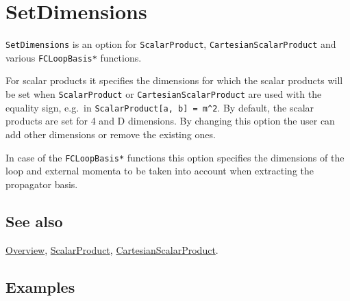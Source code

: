 \documentclass[../FeynCalcManual.tex]{subfiles}
\begin{document}
\hypertarget{setdimensions}{
\section{SetDimensions}\label{setdimensions}}

\texttt{SetDimensions} is an option for \texttt{ScalarProduct},
\texttt{CartesianScalarProduct} and various \texttt{FCLoopBasis*}
functions.

For scalar products it specifies the dimensions for which the scalar
products will be set when \texttt{ScalarProduct} or
\texttt{CartesianScalarProduct} are used with the equality sign, e.g.~in
\texttt{ScalarProduct[\allowbreak{}a,\ \allowbreak{}b] = m^2}. By
default, the scalar products are set for 4 and D dimensions. By changing
this option the user can add other dimensions or remove the existing
ones.

In case of the \texttt{FCLoopBasis*} functions this option specifies the
dimensions of the loop and external momenta to be taken into account
when extracting the propagator basis.

\subsection{See also}

\hyperlink{toc}{Overview}, \hyperlink{scalarproduct}{ScalarProduct},
\hyperlink{cartesianscalarproduct}{CartesianScalarProduct}.

\subsection{Examples}
\end{document}
